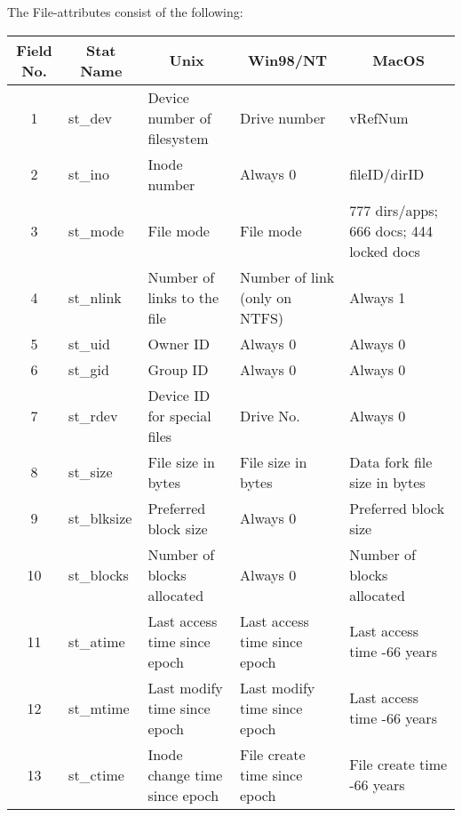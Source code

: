 The File-attributes consist of the following: 

\begin{longtable}{|p{0.6in}|p{0.7in}|p{1in}|p{1in}|p{1.4in}|}
 \hline 
\multicolumn{1}{|c|}{\bf Field No. } & \multicolumn{1}{c|}{\bf Stat Name }
& \multicolumn{1}{c|}{\bf Unix } & \multicolumn{1}{c|}{\bf Win98/NT } &
\multicolumn{1}{c|}{\bf MacOS } \\
 \hline 
\multicolumn{1}{|c|}{1 } & {st\_dev } & {Device number of filesystem } &
{Drive number } & {vRefNum } \\
 \hline 
\multicolumn{1}{|c|}{2 } & {st\_ino } & {Inode number } & {Always 0 } &
{fileID/dirID } \\
 \hline 
\multicolumn{1}{|c|}{3 } & {st\_mode } & {File mode } & {File mode } &
{777 dirs/apps; 666 docs; 444 locked docs } \\
 \hline 
\multicolumn{1}{|c|}{4 } & {st\_nlink } & {Number of links to the file } &
{Number of link (only on NTFS) } & {Always 1 } \\
 \hline 
\multicolumn{1}{|c|}{5 } & {st\_uid } & {Owner ID } & {Always 0 } &
{Always 0 } \\
 \hline 
\multicolumn{1}{|c|}{6 } & {st\_gid } & {Group ID } & {Always 0 } &
{Always 0 } \\
 \hline 
\multicolumn{1}{|c|}{7 } & {st\_rdev } & {Device ID for special files } &
{Drive No. } & {Always 0 } \\
 \hline 
\multicolumn{1}{|c|}{8 } & {st\_size } & {File size in bytes } & {File
size in bytes } & {Data fork file size in bytes } \\
 \hline 
\multicolumn{1}{|c|}{9 } & {st\_blksize } & {Preferred block size } &
{Always 0 } & {Preferred block size } \\
 \hline 
\multicolumn{1}{|c|}{10 } & {st\_blocks } & {Number of blocks allocated }
& {Always 0 } & {Number of blocks allocated } \\
 \hline 
\multicolumn{1}{|c|}{11 } & {st\_atime } & {Last access time since epoch }
& {Last access time since epoch } & {Last access time -66 years } \\
 \hline 
\multicolumn{1}{|c|}{12 } & {st\_mtime } & {Last modify time since epoch }
& {Last modify time since epoch } & {Last access time -66 years } \\
 \hline 
\multicolumn{1}{|c|}{13 } & {st\_ctime } & {Inode change time since epoch 
} & {File create time since epoch } & {File create time -66 years}
\\ \hline 

\end{longtable}

